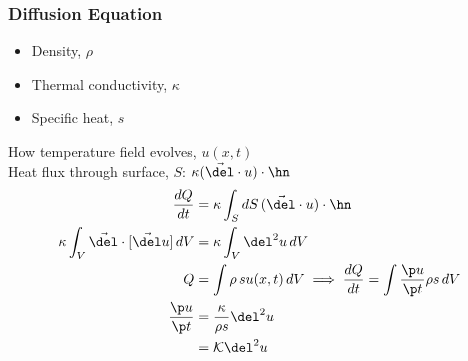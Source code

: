 \documentclass[Maths.tex]{subfiles}
\begin{document}
\subsection{Diffusion Equation}
\begin{itemize}
	\item Density, $\rho$
	\item Thermal conductivity, $\kappa$
	\item Specific heat, $s$
\end{itemize}
How temperature field evolves, $u(x,t)$ \\
Heat flux through surface, $S$: $\kappa(\vec{\del}\cdot u)\cdot\hn$
\begin{align}
	\frac{dQ}{dt} &= \kappa \int_S dS\,(\vec{\del}\cdot u)\cdot\hn \\
	\kappa\int_V \vec{\del}\cdot[\vec{\del}u]\,dV &= \kappa\int_V \del^2u\,dV \\
	Q &= \int \rho\,su(x,t)\,dV \implies \frac{dQ}{dt} = \int \frac{\p u}{\p t}\rho s\,dV \\
	\frac{\p u}{\p t} &= \frac{\kappa}{\rho s}\del^2u \\
	 				  &= \mathcal{K}\del^2u
\end{align}

\chapter{}
\end{document}
